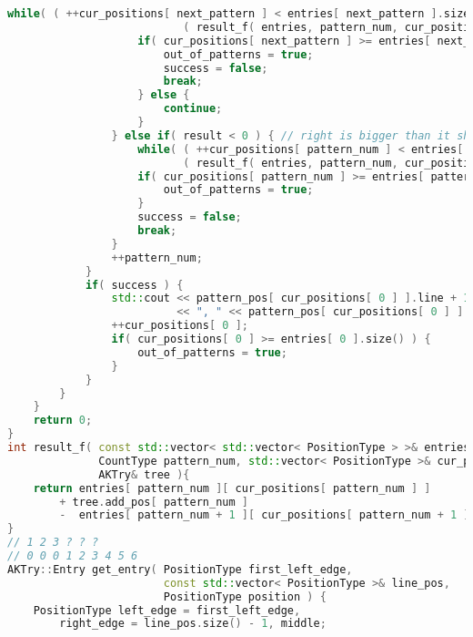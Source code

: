 \begin{lstlisting}[language=C++]
                    while( ( ++cur_positions[ next_pattern ] < entries[ next_pattern ].size() ) &&
                           ( result_f( entries, pattern_num, cur_positions, tree ) > 0 ) );
                    if( cur_positions[ next_pattern ] >= entries[ next_pattern ].size() ) {
                        out_of_patterns = true;
                        success = false;
                        break;
                    } else {
                        continue;
                    }
                } else if( result < 0 ) { // right is bigger than it should be, I should shift left
                    while( ( ++cur_positions[ pattern_num ] < entries[ pattern_num ].size() ) &&
                           ( result_f( entries, pattern_num, cur_positions, tree ) < 0 ) );
                    if( cur_positions[ pattern_num ] >= entries[ pattern_num ].size() ) {
                        out_of_patterns = true;
                    }
                    success = false;
                    break;
                }
                ++pattern_num;
            }
            if( success ) {
                std::cout << pattern_pos[ cur_positions[ 0 ] ].line + 1
                          << ", " << pattern_pos[ cur_positions[ 0 ] ].position + 1 << '\n';
                ++cur_positions[ 0 ];
                if( cur_positions[ 0 ] >= entries[ 0 ].size() ) {
                    out_of_patterns = true;
                }
            }
        }
    }
    return 0;
}
int result_f( const std::vector< std::vector< PositionType > >& entries,
              CountType pattern_num, std::vector< PositionType >& cur_positions,
              AKTry& tree ){
    return entries[ pattern_num ][ cur_positions[ pattern_num ] ]
        + tree.add_pos[ pattern_num ]
        -  entries[ pattern_num + 1 ][ cur_positions[ pattern_num + 1 ] ];
}
// 1 2 3 ? ? ?
// 0 0 0 1 2 3 4 5 6
AKTry::Entry get_entry( PositionType first_left_edge,
                        const std::vector< PositionType >& line_pos,
                        PositionType position ) {
    PositionType left_edge = first_left_edge,
        right_edge = line_pos.size() - 1, middle;


\end{lstlisting}

